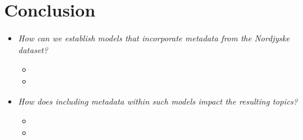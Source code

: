 \section{Conclusion}
\begin{frame}{\insertsection}{}
	\begin{itemize}
		\item \textit{How can we establish models that incorporate metadata from the Nordjyske dataset?}
		\begin{itemize}
			\item<2-> 
			\item<2-> 
		\end{itemize}
	\vspace{.2cm}
		\item \textit{How does including metadata within such models impact the resulting topics?}
		\begin{itemize}
			\item<3-> 
			\item<3-> 
		\end{itemize}
	\end{itemize}
\end{frame}